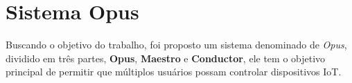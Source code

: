 \chapter{Sistema Opus}

Buscando o objetivo do trabalho, foi proposto um sistema denominado de \emph{Opus}, dividido em três partes, 
\textbf{Opus}, \textbf{Maestro} e \textbf{Conductor}, ele tem o objetivo principal de permitir que múltiplos usuários
possam controlar dispositivos IoT.

